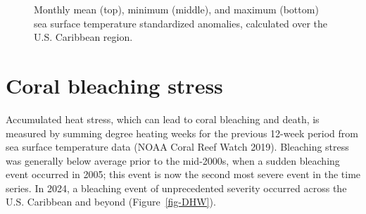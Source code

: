 \documentclass[
  letterpaper,
  oneside,
  open=any]{scrbook}
\begin{document}
\begin{figure}


\caption{\label{fig-SST}Monthly mean (top), minimum (middle), and
maximum (bottom) sea surface temperature standardized anomalies,
calculated over the U.S. Caribbean region.}

\end{figure}%

\section{Coral bleaching stress}\label{coral-bleaching-stress}

Accumulated heat stress, which can lead to coral bleaching and death, is
measured by summing degree heating weeks for the previous 12-week period
from sea surface temperature data (NOAA Coral Reef Watch 2019).
Bleaching stress was generally below average prior to the mid-2000s,
when a sudden bleaching event occurred in 2005; this event is now the
second most severe event in the time series. In 2024, a bleaching event
of unprecedented severity occurred across the U.S. Caribbean and beyond
(Figure~\ref{fig-DHW}).
\end{document}
